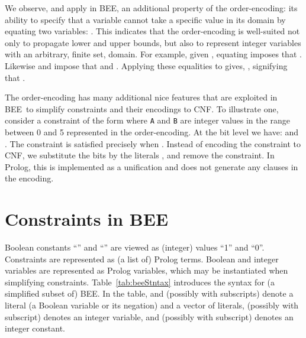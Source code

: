 \documentclass{tlp}
\newcommand{\bee}{\textsf{BEE}}
\begin{document}
We observe, and apply in \bee, an additional property of the
order-encoding: its ability to specify that a variable cannot take a
specific value  in its domain by equating two
variables: .
This indicates that the order-encoding is well-suited not only to
propagate lower and upper bounds, but also to represent integer
variables with an arbitrary, finite set, domain.
For example, given , equating  imposes
that . Likewise  and  impose that 
and . Applying these equalities to  gives,
,
signifying that .

The order-encoding has many additional nice features that are
exploited in \bee\ to simplify constraints and their encodings to
CNF. To illustrate one, consider a constraint of the form
 where \texttt{A} and \texttt{B} are integer values in
the range between 0 and 5 represented in the order-encoding. At the
bit level we have:  and
.  The constraint is satisfied precisely
when . Instead of encoding the
constraint to CNF, we substitute the bits  by
the literals , and remove the
constraint. In Prolog, this is implemented as a unification and does
not generate any clauses in the encoding.



\section{Constraints in \bee}


Boolean constants ``'' and ``'' are viewed as
(integer) values ``1'' and ``0''.
Constraints are represented as (a list of) Prolog terms. Boolean and
integer variables are represented as Prolog variables, which may be
instantiated when simplifying constraints.
Table~\ref{tab:beeStntax} introduces the syntax for (a simplified
subset of) \bee. In the table,  and  (possibly
with subscripts) denote a literal (a Boolean variable  or 
its negation) and a vector of literals,  (possibly with subscript)
denotes an integer variable, and  (possibly with
subscript) denotes an integer constant.  
\end{document}
